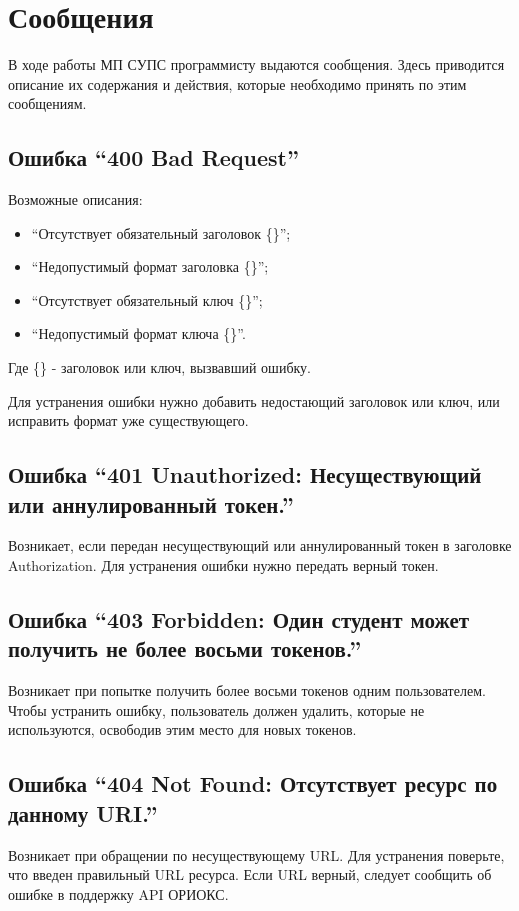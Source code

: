 \chapter{Сообщения}
\label{ch:messages}

В ходе работы МП СУПС программисту выдаются сообщения.
Здесь приводится описание их содержания и действия, которые необходимо принять по этим сообщениям.

\section*{Ошибка ``400 Bad Request''}
Возможные описания:
\begin{itemize}
  \item ``Отсутствует обязательный заголовок \{\}'';
  \item ``Недопустимый формат заголовка \{\}'';
  \item ``Отсутствует обязательный ключ \{\}'';
  \item ``Недопустимый формат ключа \{\}''.
\end{itemize}
Где \{\} - заголовок или ключ, вызвавший ошибку.

Для устранения ошибки нужно добавить недостающий заголовок или ключ, или исправить формат уже существующего.

\section*{Ошибка ``401 Unauthorized: Несуществующий или аннулированный токен.''}
Возникает, если передан несуществующий или аннулированный токен в заголовке Authorization.
Для устранения ошибки нужно передать верный токен.

\section*{Ошибка ``403 Forbidden: Один студент может получить не более восьми токенов.''}
Возникает при попытке получить более восьми токенов одним пользователем.
Чтобы устранить ошибку, пользователь должен удалить, которые не используются, освободив этим место для новых токенов.

\section*{Ошибка ``404 Not Found: Отсутствует ресурс по данному URI.''}
Возникает при обращении по несуществующему URL\@.
Для устранения поверьте, что введен правильный URL ресурса.
Если URL верный, следует сообщить об ошибке в поддержку API ОРИОКС\@.

